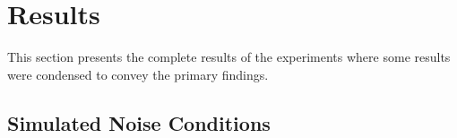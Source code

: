 \begin{comment}
    
Additional material that does not fit in the main thesis but may still be relevant to share, e.g., raw data from experiments and surveys, code listings, additional plots, pre-project reports, project agreements, contracts, logs etc., can be put in appendices. Simply issue the command \texttt{\textbackslash appendix} in the main \texttt{.tex} file, and make one chapter per appendix.

If the appendix is in the form of a ready-made PDF file, it should be supported by a small descriptive text, and included using the \texttt{pdfpages} package. To illustrate how it works, a standard project agreement (for the IE faculty at NTNU in Gjøvik) is attached here. You would probably want the included PDF file to begin on an odd (right hand) page, which is achieved by using the \texttt{\textbackslash cleardoublepage} command immediately before the \texttt{\textbackslash includepdf[]\{\}} command. Use the option \texttt{[pages=-]} to include all pages of the PDF document, or, e.g., \texttt{[pages=2-4]} to include only the given page range.

\cleardoublepage

\end{comment}







\clearpage
\section{Results}
This section presents the complete results of the experiments where some results were condensed to convey the primary findings.

\subsection{Simulated Noise Conditions} \label{app:noise}

